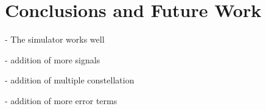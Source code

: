 \documentclass[12pt]{report}
\begin{document}
\chapter{Conclusions and Future Work}
- The simulator works well 

- addition of more signals

- addition of multiple constellation

- addition of more error terms













\end{document}
